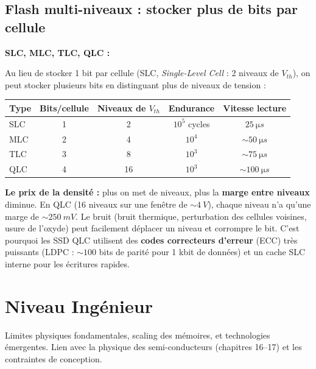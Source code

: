 \documentclass[12pt,a4paper,twoside]{book}
\begin{document}
\subsection{Flash multi-niveaux : stocker plus de bits par cellule}

\begin{formule}
\textbf{SLC, MLC, TLC, QLC :}

Au lieu de stocker 1 bit par cellule (SLC, \textit{Single-Level Cell} : 2 niveaux de $V_{th}$), on peut stocker plusieurs bits en distinguant plus de niveaux de tension :

\begin{center}
\renewcommand{\arraystretch}{1.3}
\begin{tabular}{lcccc}
\toprule
\textbf{Type} & \textbf{Bits/cellule} & \textbf{Niveaux de $V_{th}$} & \textbf{Endurance} & \textbf{Vitesse lecture} \\
\midrule
SLC & 1 & 2 & $10^5$ cycles & $\SI{25}{\micro s}$ \\
MLC & 2 & 4 & $10^4$ & $\sim\SI{50}{\micro s}$ \\
TLC & 3 & 8 & $10^3$ & $\sim\SI{75}{\micro s}$ \\
QLC & 4 & 16 & $10^3$ & $\sim\SI{100}{\micro s}$ \\
\bottomrule
\end{tabular}
\end{center}
\end{formule}

\begin{attention}
\textbf{Le prix de la densité :} plus on met de niveaux, plus la \textbf{marge entre niveaux} diminue. En QLC (16 niveaux sur une fenêtre de $\sim\SI{4}{V}$), chaque niveau n'a qu'une marge de $\sim\SI{250}{mV}$. Le bruit (bruit thermique, perturbation des cellules voisines, usure de l'oxyde) peut facilement déplacer un niveau et corrompre le bit. C'est pourquoi les SSD QLC utilisent des \textbf{codes correcteurs d'erreur} (ECC) très puissants (LDPC : $\sim 100$ bits de parité pour 1 kbit de données) et un cache SLC interne pour les écritures rapides.
\end{attention}

\section{Niveau Ingénieur}

\begin{ingenieur}
Limites physiques fondamentales, scaling des mémoires, et technologies émergentes. Lien avec la physique des semi-conducteurs (chapitres 16--17) et les contraintes de conception.
\end{ingenieur}
\end{document}
